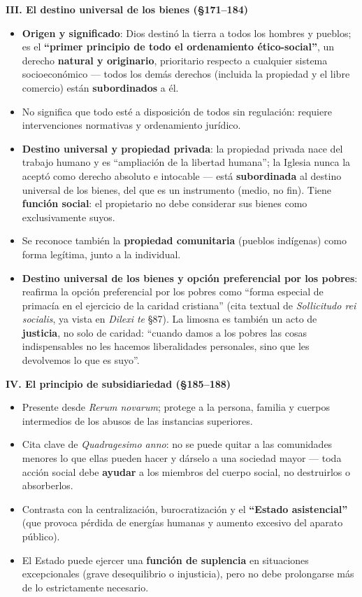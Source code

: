\documentclass[10pt,a4paper]{article}
\begin{document}
\medskip\noindent \textbf{III. El destino universal de los bienes (\S{}171--184)}\par\nopagebreak
\begin{itemize}
\item \textbf{Origen y significado}: Dios destinó la tierra a todos los hombres y pueblos; es el \textbf{``primer principio de todo el ordenamiento ético-social''}, un derecho \textbf{natural y originario}, prioritario respecto a cualquier sistema socioeconómico --- todos los demás derechos (incluida la propiedad y el libre comercio) están \textbf{subordinados} a él.
\item No significa que todo esté a disposición de todos sin regulación: requiere intervenciones normativas y ordenamiento jurídico.
\item \textbf{Destino universal y propiedad privada}: la propiedad privada nace del trabajo humano y es ``ampliación de la libertad humana''; la Iglesia nunca la aceptó como derecho absoluto e intocable --- está \textbf{subordinada} al destino universal de los bienes, del que es un instrumento (medio, no fin). Tiene \textbf{función social}: el propietario no debe considerar sus bienes como exclusivamente suyos.
\item Se reconoce también la \textbf{propiedad comunitaria} (pueblos indígenas) como forma legítima, junto a la individual.
\item \textbf{Destino universal de los bienes y opción preferencial por los pobres}: reafirma la opción preferencial por los pobres como ``forma especial de primacía en el ejercicio de la caridad cristiana'' (cita textual de \textit{Sollicitudo rei socialis}, ya vista en \textit{Dilexi te} \S{}87). La limosna es también un acto de \textbf{justicia}, no solo de caridad: ``cuando damos a los pobres las cosas indispensables no les hacemos liberalidades personales, sino que les devolvemos lo que es suyo''.
\end{itemize}

\medskip\noindent \textbf{IV. El principio de subsidiariedad (\S{}185--188)}\par\nopagebreak
\begin{itemize}
\item Presente desde \textit{Rerum novarum}; protege a la persona, familia y cuerpos intermedios de los abusos de las instancias superiores.
\item Cita clave de \textit{Quadragesimo anno}: no se puede quitar a las comunidades menores lo que ellas pueden hacer y dárselo a una sociedad mayor --- toda acción social debe \textbf{ayudar} a los miembros del cuerpo social, no destruirlos o absorberlos.
\item Contrasta con la centralización, burocratización y el \textbf{``Estado asistencial''} (que provoca pérdida de energías humanas y aumento excesivo del aparato público).
\item El Estado puede ejercer una \textbf{función de suplencia} en situaciones excepcionales (grave desequilibrio o injusticia), pero no debe prolongarse más de lo estrictamente necesario.
\end{itemize}
\end{document}
